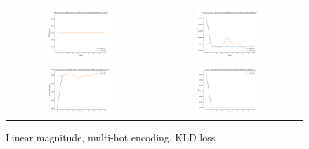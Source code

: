 \begin{appendices}
        \begin{figure}[H]
            \centering
            \begin{tabular}{cc}
                \includegraphics[width=0.48\textwidth]{figures/training_plots/ModelC-(linear_2D)-MultiHot-KLD-ADAM_14-04-2019_18-52-21_AON-accuracy.pdf} & \includegraphics[width=0.48\textwidth]{figures/training_plots/ModelC-(linear_2D)-MultiHot-KLD-ADAM_14-04-2019_18-52-21_binary-accuracy.pdf} \\
                \includegraphics[width=0.48\textwidth]{figures/training_plots/ModelC-(linear_2D)-MultiHot-KLD-ADAM_14-04-2019_18-52-21_binary-cross-entropy.pdf} & \includegraphics[width=0.48\textwidth]{figures/training_plots/ModelC-(linear_2D)-MultiHot-KLD-ADAM_14-04-2019_18-52-21_loss.pdf}
            \end{tabular}
            \caption*{Linear magnitude, multi-hot encoding, KLD loss}
        \end{figure}
        

\end{appendices}
